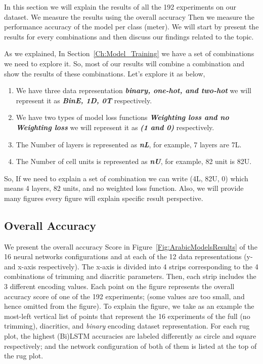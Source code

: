 In this section we will explain the results of all the 192 experiments on our dataset. We measure the results using the overall accuracy Then we measure the performance accuracy of the model per class (meter). We will start by present the results for every combinations and then discuss our findings related to the topic.

As we explained, In Section~\ref{Ch:Model_Training} we have a set of combinations we need to explore it. So, most of our results will combine a combination and show the results of these combinations. Let's explore it as below,
\begin{enumerate}
  \item  We have three data representation \textbf{\textit{\textit{binary}, \textit{one-hot}, and \textit{two-hot}}} we will represent it as \textbf{\textit{BinE, 1D, 0T}} respectively.
  \item We have two types of model loss functions \textbf{\textit{Weighting loss and no Weighting loss}} we will represent it as \textbf{\textit{(1 and 0)}} respectively.
  \item The Number of layers is represented as \textbf{\textit{nL}}, for example, 7 layers are 7L.
  \item The Number of cell units is represented as \textbf{\textit{nU}}, for example, 82 unit is 82U.
\end{enumerate}

So, If we need to explain a set of combination we can write (4L, 82U, 0) which means 4 layers, 82 units, and no weighted loss function. Also, we will provide many figures every figure will explain specific result perspective.

\subsection{Overall Accuracy}

We present the overall accuracy Score in Figure~\ref{Fig:ArabicModelsResults} of the 16 neural networks configurations and at each of the 12 data representations (y- and x-axis respectively). The x-axis is divided into 4 strips corresponding to the 4 combinations of trimming and diacritic parameters. Then, each strip includes the 3 different encoding values. Each point on the figure represents the overall accuracy score of one of the 192 experiments; (some values are too small, and hence omitted from the figure). To explain the figure, we take as an example the most-left vertical list of points that represent the 16 experiments of the full (no trimming), diacritics, and \textit{binary} encoding dataset representation. For each rug plot, the highest (Bi)LSTM accuracies are labeled differently as circle and square respectively; and the network configuration of both of them is listed at the top of the rug plot.

